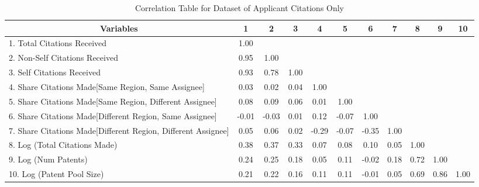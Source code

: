 \documentclass[12pt,letterpaper]{article}
\begin{document}
\begin{center}
\begin{table}[htbp]\centering \caption{Correlation Table for Dataset of Applicant Citations Only \label{a.corrtable}}
\scriptsize
\singlespacing
\begin{adjustbox}{angle=0}
\begin{tabular}{l  c  c  c  c  c  c  c  c  c  c }

\hline
\multicolumn{1}{c}{Variables} &1&2&3&4&5&6&7&8&9&10\\ \hline
1. Total Citations Received&1.00\\
2. Non-Self Citations Received&0.95&1.00\\
3. Self Citations Received&0.93&0.78&1.00\\
4. Share Citations Made[Same Region, Same Assignee]&0.03&0.02&0.04&1.00\\
5. Share Citations Made[Same Region, Different Assignee]&0.08&0.09&0.06&0.01&1.00\\
6. Share Citations Made[Different Region, Same Assignee]&-0.01&-0.03&0.01&0.12&-0.07&1.00\\
7. Share Citations Made[Different Region, Different Assignee]&0.05&0.06&0.02&-0.29&-0.07&-0.35&1.00\\
8. Log (Total Citations Made)&0.38&0.37&0.33&0.07&0.08&0.10&0.05&1.00\\
9. Log (Num Patents)&0.24&0.25&0.18&0.05&0.11&-0.02&0.18&0.72&1.00\\
10. Log (Patent Pool Size)&0.21&0.22&0.16&0.11&0.11&-0.01&0.05&0.69&0.86&1.00\\ \hline
\end{tabular}
\end{adjustbox}
\end{table}
\end{center}
\end{document}
